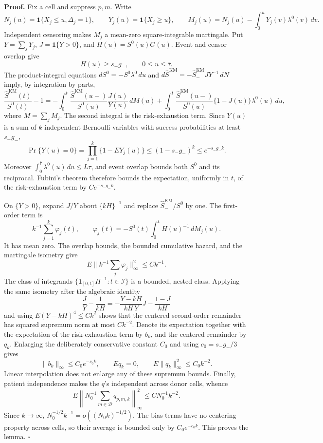\textbf{Proof.}
Fix a cell and suppress \(p,m\).  Write
\[
 N_j(u)=\mathbf 1\{X_j\le u,\Delta_j=1\},\qquad
 Y_j(u)=\mathbf 1\{X_j\ge u\},\qquad
 M_j(u)=N_j(u)-\int_0^uY_j(v)\lambda^0(v)\,dv .
\]
Independent censoring makes \(M_j\) a mean-zero square-integrable martingale.  Put \(Y=\sum_jY_j\), \(J=\mathbf 1\{Y>0\}\), and \(H(u)=S^0(u)G(u)\).  Event and censor overlap give
\[
 H(u)\ge s_-g_-,\qquad 0\le u\le\bar\tau .
\]
The product-integral equations \(dS^0=-S^0\lambda^0\,du\) and \(d\widehat S^{\mathrm{KM}}=-\widehat S^{\mathrm{KM}}_-JY^{-1}\,dN\) imply, by integration by parts,
\[
 \frac{\widehat S^{\mathrm{KM}}(t)}{S^0(t)}-1
 =-\int_0^t\frac{\widehat S^{\mathrm{KM}}(u-)}{S^0(u)}\frac{J(u)}{Y(u)}\,dM(u)
 +\int_0^t\frac{\widehat S^{\mathrm{KM}}(u-)}{S^0(u)}\{1-J(u)\}\lambda^0(u)\,du ,
\]
where \(M=\sum_jM_j\).  The second integral is the risk-exhaustion term.  Since \(Y(u)\) is a sum of \(k\) independent Bernoulli variables with success probabilities at least \(s_-g_-\),
\[
 \Pr\{Y(u)=0\}=\prod_{j=1}^k\{1-EY_j(u)\}
 \le (1-s_-g_-)^k\le e^{-s_-g_-k}.
\]
Moreover \(\int_0^{\bar\tau}\lambda^0(u)\,du\le L\bar\tau\), and event overlap bounds both \(S^0\) and its reciprocal.  Fubini's theorem therefore bounds the expectation, uniformly in \(t\), of the risk-exhaustion term by \(C e^{-s_-g_-k}\).

On \(\{Y>0\}\), expand \(J/Y\) about \(\{kH\}^{-1}\) and replace \(\widehat S^{\mathrm{KM}}_-/S^0\) by one.  The first-order term is
\[
 k^{-1}\sum_{j=1}^k\varphi_j(t),\qquad
 \varphi_j(t)=-S^0(t)\int_0^tH(u)^{-1}\,dM_j(u).
\]
It has mean zero.  The overlap bounds, the bounded cumulative hazard, and the martingale isometry give
\[
 E\|k^{-1}\textstyle\sum_j\varphi_j\|_\infty^2\le Ck^{-1}.
\]
The class of integrands \(\{\mathbf 1_{[0,t]}H^{-1}:t\in\mathcal I\}\) is a bounded, nested class.  Applying the same isometry after the algebraic identity
\[
 \frac{J}{Y}-\frac1{kH}
 =-\frac{Y-kH}{kH\,Y}J-\frac{1-J}{kH}
\]
and using \(E(Y-kH)^4\le Ck^2\) shows that the centered second-order remainder has squared supremum norm at most \(Ck^{-2}\).  Denote its expectation together with the expectation of the risk-exhaustion term by \(b_k\), and the centered remainder by \(q_k\).  Enlarging the deliberately conservative constant \(C_0\) and using \(c_0=s_-g_-/3\) gives
\[
 \|b_k\|_\infty\le C_0e^{-c_0k},\qquad
 Eq_k=0,\qquad E\|q_k\|_\infty^2\le C_0k^{-2}.
\]
Linear interpolation does not enlarge any of these supremum bounds.  Finally, patient independence makes the \(q\)'s independent across donor cells, whence
\[
 E\left\|N_0^{-1}\sum_{m\in\mathcal D}q_{p,m,k}\right\|_\infty^2
 \le C N_0^{-1}k^{-2}.
\]
Since \(k\to\infty\), \(N_0^{-1/2}k^{-1}=o((N_0k)^{-1/2})\).  The bias terms have no centering property across cells, so their average is bounded only by \(C_0e^{-c_0k}\).  This proves the lemma. \(\square\)